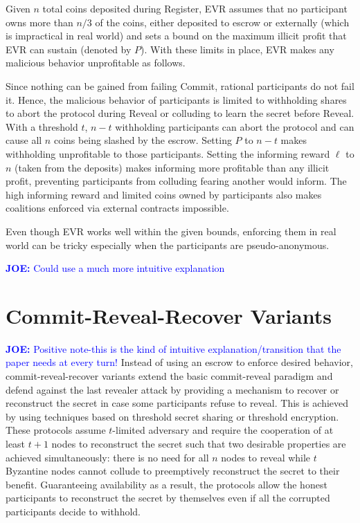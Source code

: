 \documentclass[letterpaper,twocolumn,10pt]{article}
\theoremstyle{definition}
\theoremstyle{remark}
\newcommand{\joenote}[1]{\textcolor{blue}{\textbf{JOE:} #1}}
\begin{document}
Given $n$ total coins deposited during Register, EVR assumes that no participant owns more than $n/3$ of the coins, either deposited to escrow or externally (which is impractical in real world) and sets a bound on the maximum illicit profit that EVR can sustain (denoted by $P$). With these limits in place, EVR makes any malicious behavior unprofitable as follows. 

Since nothing can be gained from failing Commit, rational participants do not fail it. Hence, the malicious behavior of participants is limited to withholding shares to abort the protocol during Reveal or colluding to learn the secret before Reveal. With a threshold $t$, $n-t$ withholding participants can abort the protocol and can cause all $n$ coins being slashed by the escrow. Setting $P$ to $n-t$ makes withholding unprofitable to those participants. Setting the informing reward $\ell$ to $n$ (taken from the deposits) makes informing more profitable than any illicit profit, preventing participants from colluding fearing another would inform. The high informing reward and limited coins owned by participants also makes coalitions enforced via external contracts impossible.

Even though EVR works well within the given bounds, enforcing them in real world can be tricky especially when the participants are pseudo-anonymous.

\joenote{Could use a much more intuitive explanation}
\section{Commit-Reveal-Recover Variants}
\label{section:commit-reveal-recover}
\joenote{Positive note-this is the kind of intuitive explanation/transition that the paper needs at every turn!}
Instead of using an escrow to enforce desired behavior, commit-reveal-recover variants extend the basic commit-reveal paradigm and defend against the last revealer attack by providing a mechanism to recover or reconstruct the secret in case some participants refuse to reveal. This is achieved by using techniques based on threshold secret sharing or threshold encryption. These protocols assume $t$-limited adversary and require the cooperation of at least $t + 1$ nodes to reconstruct the secret such that two desirable properties are achieved simultaneously: there is no need for all $n$ nodes to reveal while $t$ Byzantine nodes cannot collude to preemptively reconstruct the secret to their benefit. Guaranteeing availability as a result, the protocols allow the honest participants to reconstruct the secret by themselves even if all the corrupted participants decide to withhold.
\end{document}
